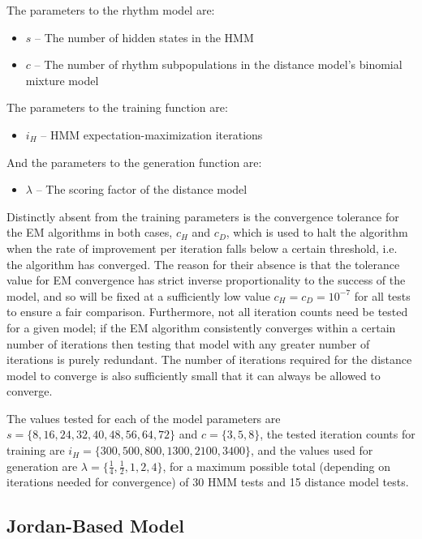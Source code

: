 \documentclass[ author={Stephen Livermore-Tozer},
				supervisor={Dr. Peter Flach},
				degree={MEng},
				title={Algorithmic Co-composition Using Machine Learning},
				subtitle={},
				type={research},
				year={2016} ]{dissertation}
\begin{document}
	The parameters to the rhythm model are:
	\begin{itemize}
		\item $s$ -- The number of hidden states in the HMM
		\item $c$ -- The number of rhythm subpopulations in the distance model's binomial mixture model
	\end{itemize}
	The parameters to the training function are:
	\begin{itemize}
		\item $i_H$ -- HMM expectation-maximization iterations
	\end{itemize}
	And the parameters to the generation function are:
	\begin{itemize}
		\item $\lambda$ -- The scoring factor of the distance model
	\end{itemize}
	
	Distinctly absent from the training parameters is the convergence tolerance for the EM algorithms in both cases, $c_H$ and $c_D$, which is used to halt the algorithm when the rate of improvement per iteration falls below a certain threshold, i.e. the algorithm has converged. The reason for their absence is that the tolerance value for EM convergence has strict inverse proportionality to the success of the model, and so will be fixed at a sufficiently low value $c_H = c_D = 10^{-7}$ for all tests to ensure a fair comparison. Furthermore, not all iteration counts need be tested for a given model; if the EM algorithm consistently converges within a certain number of iterations then testing that model with any greater number of iterations is purely redundant. The number of iterations required for the distance model to converge is also sufficiently small that it can always be allowed to converge. 
	
	The values tested for each of the model parameters are $s = \{8,16,24,32,40,48,56,64,72\}$ and $c = \{3,5,8\}$, the tested iteration counts for training are $i_H = \{300, 500, 800, 1300, 2100, 3400\}$, and the values used for generation are $\lambda = \{\frac{1}{4},\frac{1}{2},1,2,4\}$, for a maximum possible total (depending on iterations needed for convergence) of 30 HMM tests and 15 distance model tests.
	
	
	\subsection{Jordan-Based Model}
	
\end{document}
